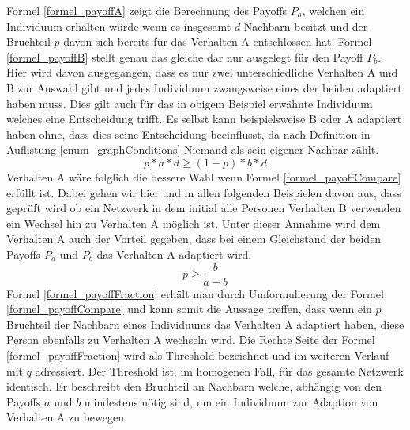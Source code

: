 \documentclass[12pt]{article}
\begin{document}
 Formel \ref{formel_payoffA} zeigt die Berechnung des Payoffs $P_a$, welchen ein Individuum erhalten würde wenn es insgesamt $d$ Nachbarn besitzt und der Bruchteil $p$ davon sich bereits für das Verhalten A entschlossen hat. Formel \ref{formel_payoffB} stellt genau das gleiche dar nur ausgelegt für den Payoff $P_b$. Hier wird davon ausgegangen, dass es nur zwei unterschiedliche Verhalten A und B zur Auswahl gibt und jedes Individuum zwangsweise eines der beiden adaptiert haben muss. Dies gilt auch für das in obigem Beispiel erwähnte Individuum welches eine Entscheidung trifft. Es selbst kann beispielsweise B oder A adaptiert haben ohne, dass dies seine Entscheidung beeinflusst, da nach Definition in Auflistung \ref{enum_graphConditions} Niemand als sein eigener Nachbar zählt.
  \begin{equation}
 \label{formel_payoffCompare}
 p*a*d \geq (1-p)*b*d
 \end{equation}
Verhalten A wäre folglich die bessere Wahl wenn Formel \ref{formel_payoffCompare} erfüllt ist. Dabei gehen wir hier und in allen folgenden Beispielen davon aus, dass geprüft wird ob ein Netzwerk in dem initial alle Personen Verhalten B verwenden ein Wechsel hin zu Verhalten A möglich ist. Unter dieser Annahme wird dem Verhalten A auch der Vorteil gegeben, dass bei einem Gleichstand der beiden Payoffs $P_a$ und $P_b$ das Verhalten A adaptiert wird.
%
  \begin{equation}
 \label{formel_payoffFraction}
 p \geq \frac{b}{a+b}
 \end{equation}
Formel \ref{formel_payoffFraction} erhält man durch Umformulierung der Formel \ref{formel_payoffCompare} und kann somit die Aussage treffen, dass wenn ein $p$ Bruchteil der Nachbarn eines Individuums das Verhalten A adaptiert haben, diese Person ebenfalls zu Verhalten A wechseln wird. Die Rechte Seite der Formel \ref{formel_payoffFraction} wird als Threshold bezeichnet und im weiteren Verlauf mit $q$ adressiert. Der Threshold ist, im homogenen Fall, für das gesamte Netzwerk identisch. Er beschreibt den Bruchteil an Nachbarn welche, abhängig von den Payoffs $a$ und $b$ mindestens nötig sind, um ein Individuum zur Adaption von Verhalten A zu bewegen.
\end{document}
